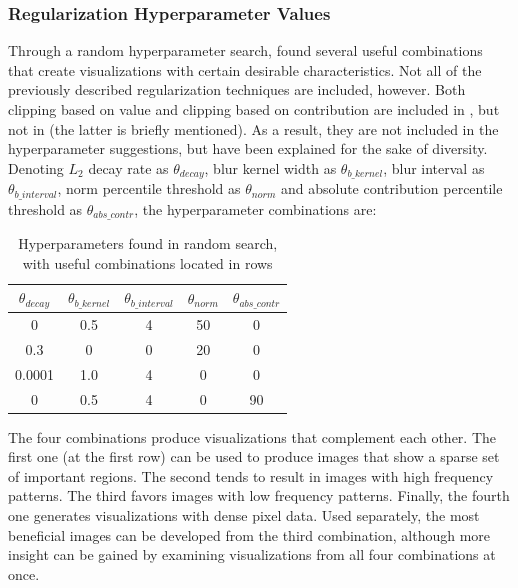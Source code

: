 \subsubsection{Regularization Hyperparameter Values}

Through a random hyperparameter search, \cite{deepvis} found several useful combinations that create visualizations with certain desirable characteristics. Not all of the previously described regularization techniques are included, however. Both clipping based on value and clipping based on contribution are included in \cite{deepvis_web}, but not in \cite{deepvis} (the latter is briefly mentioned). As a result, they are not included in the hyperparameter suggestions, but have been explained for the sake of diversity. \\

\noindent Denoting $L_2$ decay rate as $\theta_{decay}$, blur kernel width as $\theta_{b\_kernel}$, blur interval as $\theta_{b\_interval}$, norm percentile threshold as $\theta_{norm}$ and absolute contribution percentile threshold as $\theta_{abs\_contr}$, the hyperparameter combinations are:

\begin{table}[!h]
\begin{center}
\begin{tabular}{|c|c|c|c|c|}
\hline
\textbf{$\theta_{decay}$} & \textbf{$\theta_{b\_kernel}$} & \textbf{$\theta_{b\_interval}$} & \textbf{$\theta_{norm}$} & \textbf{$\theta_{abs\_contr}$} \\ \hline
0 & 0.5 & 4 & 50 & 0 \\ \hline
0.3 & 0 & 0 & 20 & 0 \\ \hline
0.0001 & 1.0 & 4 & 0 & 0 \\ \hline
0 & 0.5 & 4 & 0 & 90 \\ \hline
\end{tabular}
\end{center}
\caption{Hyperparameters found in random search, with useful combinations located in rows}
\label{tab:reg_hyperparams}
\end{table}

\noindent The four combinations produce visualizations that complement each other. The first one (at the first row) can be used to produce images that show a sparse set of important regions. The second tends to result in images with high frequency patterns. The third favors images with low frequency patterns. Finally, the fourth one generates visualizations with dense pixel data. Used separately, the most beneficial images can be developed from the third combination, although more insight can be gained by examining visualizations from all four combinations at once.

